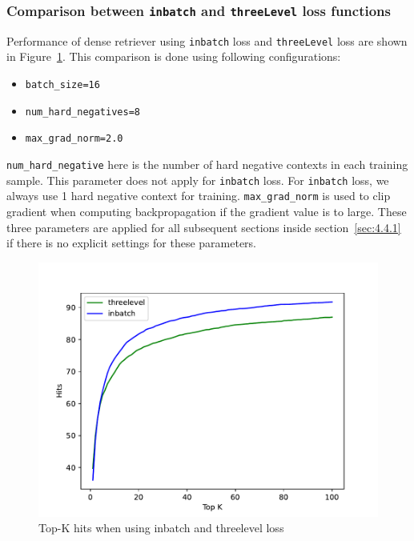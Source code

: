 \documentclass[12pt, sort&compress]{report}
\begin{document}
\subsubsection{Comparison between {\tt inbatch} and {\tt threeLevel} loss functions}
\label{sec:4.4.1.1}
Performance of dense retriever using {\tt inbatch} loss and {\tt threeLevel} loss are shown in Figure~\ref{fig:12}. This comparison is done using following configurations:
\begin{itemize}
	\item {\tt batch\_size=16}
	\item {\tt num\_hard\_negatives=8}
	\item {\tt max\_grad\_norm=2.0}
\end{itemize}
\par {\tt num\_hard\_negative} here is the number of hard negative contexts in each training sample. This parameter does not apply for {\tt inbatch} loss. For {\tt inbatch} loss, we always use 1 hard negative context for training. {\tt max\_grad\_norm} is used to clip gradient when computing backpropagation if the gradient value is to large. These three parameters are applied for all subsequent sections inside section~\ref{sec:4.4.1} if there is no explicit settings for these parameters.
\begin{figure}[!htbp]
	\centering
	\includegraphics[scale=.7]{images/PDF/experiments/inbatch_threelevel_4-1-1.pdf}
	\caption{Top-K hits when using inbatch and threelevel loss}
	\label{fig:12}
\end{figure}
\end{document}
